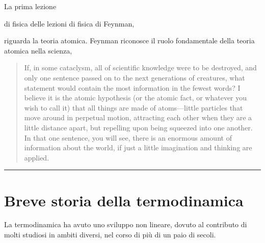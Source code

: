 \documentclass[letterpaper,10pt,italian]{jupyterBook}
\begin{document}
\sphinxAtStartPar
La prima lezione%
\begin{footnote}[1]\sphinxAtStartFootnote
{}
%
\end{footnote} di fisica delle lezioni di fisica di Feynman,  %
\begin{footnote}[2]\sphinxAtStartFootnote
{}
%
\end{footnote} riguarda la teoria atomica. Feynman riconosce il ruolo fondamentale della teoria atomica nella scienza,
\begin{quote}

\sphinxAtStartPar
If, in some cataclysm, all of scientific knowledge were to be destroyed, and only one sentence passed on to the next generations of creatures, what statement would contain the most information in the fewest words? I believe it is the atomic hypothesis (or the atomic fact, or whatever you wish to call it) that all things are made of atoms—little particles that move around in perpetual motion, attracting each other when they are a little distance apart, but repelling upon being squeezed into one another. In that one sentence, you will see, there is an enormous amount of information about the world, if just a little imagination and thinking are applied.
\end{quote}






\bigskip\hrule\bigskip


\sphinxstepscope


\section{Breve storia della termodinamica}
\label{\detokenize{ch/thermodynamics/foundation-history:breve-storia-della-termodinamica}}\label{\detokenize{ch/thermodynamics/foundation-history:physics-hs-thermodynamics-foundation-history}}\label{\detokenize{ch/thermodynamics/foundation-history::doc}}
\sphinxAtStartPar
La termodinamica ha avuto uno sviluppo non lineare, dovuto al contributo di molti studiosi in ambiti diversi, nel corso di più di un paio di secoli.
\end{document}

